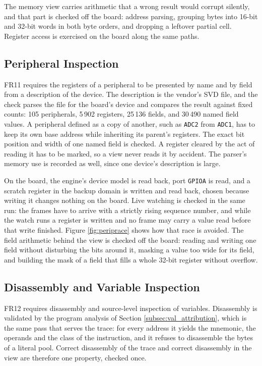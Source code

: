 The memory view carries arithmetic that a wrong result would corrupt silently, and that part is checked off the board: address parsing, grouping bytes into 16-bit and 32-bit words in both byte orders, and dropping a leftover partial cell. Register access is exercised on the board along the same paths.

\subsection{Peripheral Inspection}
\label{subsec:val_peripherals}
FR11 requires the registers of a peripheral to be presented by name and by field from a description of the device. The description is the vendor's SVD file, and the check parses the file for the board's device and compares the result against fixed counts: 105 peripherals, 5\,902 registers, 25\,136 fields, and 30\,490 named field values. A peripheral defined as a copy of another, such as \texttt{ADC2} from \texttt{ADC1}, has to keep its own base address while inheriting its parent's registers. The exact bit position and width of one named field is checked. A register cleared by the act of reading it has to be marked, so a view never reads it by accident. The parser's memory use is recorded as well, since one device's description is large.

On the board, the engine's device model is read back, port \texttt{GPIOA} is read, and a scratch register in the backup domain is written and read back, chosen because writing it changes nothing on the board. Live watching is checked in the same run: the frames have to arrive with a strictly rising sequence number, and while the watch runs a register is written and no frame may carry a value read before that write finished. Figure \ref{fig:periprace} shows how that race is avoided. The field arithmetic behind the view is checked off the board: reading and writing one field without disturbing the bits around it, masking a value too wide for its field, and building the mask of a field that fills a whole 32-bit register without overflow.

\subsection{Disassembly and Variable Inspection}
\label{subsec:val_disasm}
FR12 requires disassembly and source-level inspection of variables. Disassembly is validated by the program analysis of Section \ref{subsec:val_attribution}, which is the same pass that serves the trace: for every address it yields the mnemonic, the operands and the class of the instruction, and it refuses to disassemble the bytes of a literal pool. Correct disassembly of the trace and correct disassembly in the view are therefore one property, checked once.

